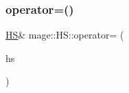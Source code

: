\hypertarget{structmage_1_1_h_s_aadf0fc6780e03527497a40f1c2de14ab}{}\label{structmage_1_1_h_s_aadf0fc6780e03527497a40f1c2de14ab} 
\subsubsection{\texorpdfstring{operator=()}{operator=()}\hspace{0.1cm}{\footnotesize\ttfamily [2/2]}}
{\footnotesize\ttfamily \hyperlink{structmage_1_1_h_s}{HS}\& mage\+::\+H\+S\+::operator= (\begin{DoxyParamCaption}\item[{\hyperlink{structmage_1_1_h_s}{HS} \&\&}]{hs }\end{DoxyParamCaption})\hspace{0.3cm}{\ttfamily [delete]}}

